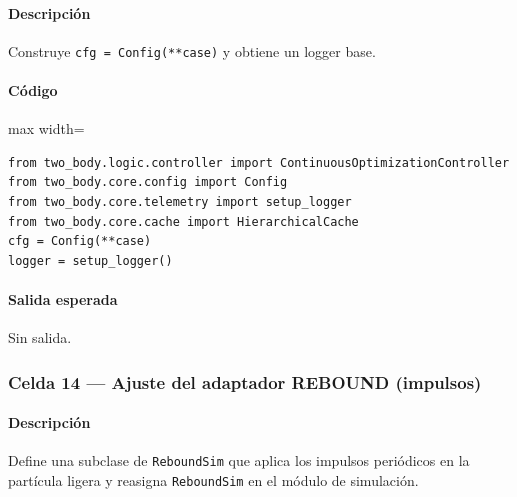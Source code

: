 \paragraph{Descripción} Construye \texttt{cfg = Config(**case)} y obtiene un logger base. %
\paragraph{Código}
\begin{listing}[H]
\caption{Celda 12: creación de la configuración de trabajo}
\par\smallskip
\begin{adjustbox}{max width=\textwidth}
\begin{minipage}{\textwidth}
\begin{verbatim}
from two_body.logic.controller import ContinuousOptimizationController
from two_body.core.config import Config
from two_body.core.telemetry import setup_logger
from two_body.core.cache import HierarchicalCache
cfg = Config(**case)
logger = setup_logger()
\end{verbatim}
\end{minipage}
\end{adjustbox}
\end{listing}
\paragraph{Salida esperada} Sin salida.

\subsubsection*{Celda 14 — Ajuste del adaptador REBOUND (impulsos)}
\paragraph{Descripción} Define una subclase de \texttt{ReboundSim} que aplica los impulsos periódicos en la partícula ligera y reasigna \texttt{ReboundSim} en el módulo de simulación.
